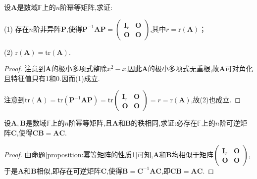 \documentclass[../../main.tex]{subfiles}%
\begin{document}
\begin{proposition}\label{proposition:幂等矩阵的性质1}
设\(\boldsymbol{A}\)是数域\(\mathbb{F}\)上的\(n\)阶幂等矩阵,求证:

(1) 存在\(n\)阶非异阵\(\boldsymbol{P}\),使得\(\boldsymbol{P}^{-1}\boldsymbol{A}\boldsymbol{P}=\begin{pmatrix}\boldsymbol{I}_r&\boldsymbol{O}\\ \boldsymbol{O}&\boldsymbol{O}\end{pmatrix}\),其中\(r = \text{r}(\boldsymbol{A})\)；

(2) \(\text{r}(\boldsymbol{A})=\text{tr}(\boldsymbol{A})\).
\end{proposition}
\begin{proof}
注意到$\boldsymbol{A}$的极小多项式整除$x^2-x$,因此$\boldsymbol{A}$的极小多项式无重根,故$\boldsymbol{A}$可对角化且特征值只有1和0.因而(1)成立.

注意到\(\text{tr}(\boldsymbol{A})=\text{tr}(\boldsymbol{P}^{-1}\boldsymbol{A}\boldsymbol{P})=\text{tr}\begin{pmatrix}\boldsymbol{I}_r&\boldsymbol{O}\\ \boldsymbol{O}&\boldsymbol{O}\end{pmatrix}=r = \text{r}(\boldsymbol{A})\),故(2)也成立.
\end{proof}

\begin{example}
设\(\boldsymbol{A},\boldsymbol{B}\)是数域\(\mathbb{F}\)上的\(n\)阶幂等矩阵,且\(\boldsymbol{A}\)和\(\boldsymbol{B}\)的秩相同,求证:必存在\(\mathbb{F}\)上的\(n\)阶可逆矩阵\(\boldsymbol{C}\),使得\(\boldsymbol{C}\boldsymbol{B}=\boldsymbol{A}\boldsymbol{C}\).
\end{example}
\begin{proof}
由\hyperref[proposition:幂等矩阵的性质1]{命题\ref{proposition:幂等矩阵的性质1}}可知,\(\boldsymbol{A}\)和\(\boldsymbol{B}\)均相似于矩阵\(\begin{pmatrix}\boldsymbol{I}_r&\boldsymbol{O}\\ \boldsymbol{O}&\boldsymbol{O}\end{pmatrix}\),于是\(\boldsymbol{A}\)和\(\boldsymbol{B}\)相似,即存在可逆矩阵\(\boldsymbol{C}\),使得\(\boldsymbol{B}=\boldsymbol{C}^{-1}\boldsymbol{A}\boldsymbol{C}\),即\(\boldsymbol{C}\boldsymbol{B}=\boldsymbol{A}\boldsymbol{C}\).
\end{proof}
\end{document}
